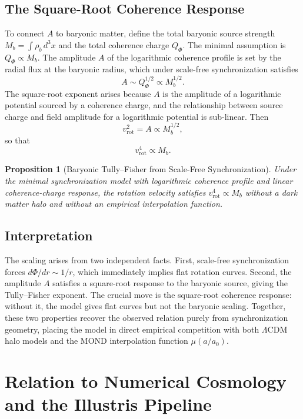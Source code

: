 \documentclass[11pt, a4paper, twocolumn]{article}
\newtheorem{proposition}[definition]{Proposition}
\begin{document}
\subsection{The Square-Root Coherence Response}

To connect $A$ to baryonic matter, define the total baryonic source strength
$M_b = \int\rho_b\,d^3x$ and the total coherence charge $Q_\Phi$. The minimal
assumption is $Q_\Phi \propto M_b$. The amplitude $A$ of the logarithmic
coherence profile is set by the radial flux at the baryonic radius, which under
scale-free synchronization satisfies
\[
    A \sim Q_\Phi^{1/2} \propto M_b^{1/2}.
\]
The square-root exponent arises because $A$ is the amplitude of a logarithmic
potential sourced by a coherence charge, and the relationship between source
charge and field amplitude for a logarithmic potential is sub-linear. Then
\[
    v_{\mathrm{rot}}^2 = A \propto M_b^{1/2},
\]
so that
\[
    v_{\mathrm{rot}}^4 \propto M_b.
\]

\begin{proposition}[Baryonic Tully--Fisher from Scale-Free Synchronization]
Under the minimal synchronization model with logarithmic coherence profile and
linear coherence-charge response, the rotation velocity satisfies
$v_{\mathrm{rot}}^4 \propto M_b$ without a dark matter halo and without an
empirical interpolation function.
\end{proposition}

\subsection{Interpretation}

The scaling arises from two independent facts. First, scale-free synchronization
forces $d\Phi/dr \sim 1/r$, which immediately implies flat rotation curves.
Second, the amplitude $A$ satisfies a square-root response to the baryonic
source, giving the Tully--Fisher exponent. The crucial move is the square-root
coherence response: without it, the model gives flat curves but not the baryonic
scaling. Together, these two properties recover the observed relation purely from
synchronization geometry, placing the model in direct empirical competition with
both $\Lambda$CDM halo models and the MOND interpolation function $\mu(a/a_0)$.

\section{Relation to Numerical Cosmology and the Illustris Pipeline}
\end{document}
